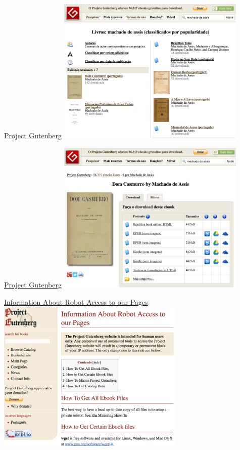 \documentclass[12pt]{beamer}
\begin{document}
\begin{frame}[fragile]{\href{http://www.gutenberg.org/}{Project Gutenberg}}
    \href{http://www.gutenberg.org/}{\includegraphics[width=9cm]{gutenberg_busca}}
\end{frame}

\begin{frame}[fragile]{\href{http://www.gutenberg.org/}{Project Gutenberg}}
    \href{http://www.gutenberg.org/}{\includegraphics[width=9cm]{gutenberg_lista}}
\end{frame}

\begin{frame}[fragile]{\href{http://www.gutenberg.org/wiki/Gutenberg:Information\_About\_Robot\_Access\_to\_our\_Pages}{Information About Robot Access to our Pages}}
    \href{http://www.gutenberg.org/wiki/Gutenberg:Information\_About\_Robot\_Access\_to\_our\_Pages}{\includegraphics[width=9cm]{gutenberg_robot}}
\end{frame}
\end{document}

